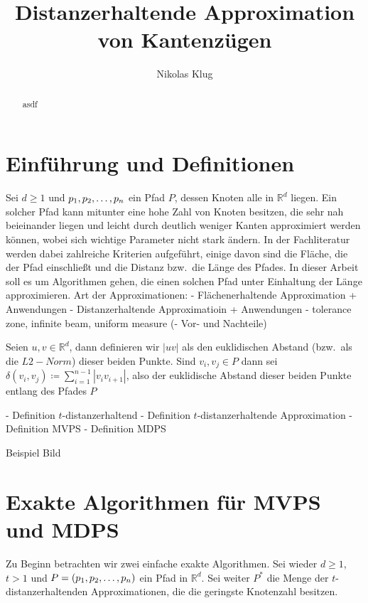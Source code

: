 \documentclass[11pt]{article}
\title{Distanzerhaltende Approximation von Kantenzügen}
\author{Nikolas Klug}
\newcommand{\R}{\mathbb{R}}
\newcommand{\n}{\newline}
\begin{document}
    \maketitle

    \begin{abstract}
        asdf
    \end{abstract}

    \section{Einführung und Definitionen}
    \label{sec:intro}

    Sei $d\geq1$ und $p_1, p_2, \mathellipsis, p_n$ ein Pfad $P$, dessen Knoten alle in $\R^{d}$ liegen.
    Ein solcher Pfad kann mitunter eine hohe Zahl von Knoten besitzen, die sehr nah beieinander liegen und leicht durch deutlich weniger Kanten approximiert werden können, wobei sich wichtige Parameter nicht stark ändern. In der Fachliteratur werden dabei zahlreiche Kriterien aufgeführt, einige davon sind die Fläche, die der Pfad einschließt und die Distanz bzw.\ die Länge des Pfades. In dieser Arbeit soll es um Algorithmen gehen, die einen solchen Pfad unter Einhaltung der Länge approximieren.
    Art der Approximationen:
    - Flächenerhaltende Approximation + Anwendungen\n
    - Distanzerhaltende Approximatioin + Anwendungen\n
    - tolerance zone, infinite beam, uniform measure\textellipsis\n
    (- Vor- und Nachteile)


    Seien $u, v \in \R^d$, dann definieren wir $|uv|$ als den euklidischen Abstand
    (bzw.\ als die $L2-Norm$) dieser beiden Punkte.
    Sind $v_i, v_j \in P$ dann sei $\delta(v_i, v_j) \coloneqq \sum\limits_{i=1}^{n-1}{|v_i
    v_{i+1}|}$, also der euklidische Abstand dieser beiden Punkte entlang des Pfades $P$

    - Definition $t$-distanzerhaltend\n
    - Definition $t$-distanzerhaltende Approximation\n
    - Definition MVPS\n
    - Definition MDPS\n

    Beispiel Bild

    \section{Exakte Algorithmen für MVPS und MDPS}
    \label{sec:exact}
    
    Zu Beginn betrachten wir zwei einfache exakte Algorithmen.
    Sei wieder $d\geq1$, $t>1$ und $P = (p_1, p_2, \mathellipsis, p_n)$ ein Pfad in $\R^d$. Sei weiter $P^*$ die Menge der $t$-distanzerhaltenden Approximationen, die die geringste Knotenzahl besitzen.
    
\end{document}
